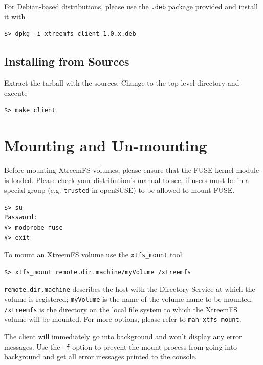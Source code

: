 \documentclass[a4paper,10pt]{book}
\begin{document}
For Debian-based distributions, please use the \texttt{.deb} package provided and install it with


\begin{verbatim}
$> dpkg -i xtreemfs-client-1.0.x.deb
\end{verbatim}



\subsection{Installing from Sources}

Extract the tarball with the sources. Change to the top level directory and execute


\begin{verbatim}
$> make client
\end{verbatim}


\section{Mounting and Un-mounting}
\label{sec:mount_vol}

Before mounting XtreemFS volumes, please ensure that the FUSE kernel module is loaded. Please check your distribution's manual to see, if users must be in a special group (e.g. \texttt{trusted} in openSUSE) to be allowed to mount FUSE.


\begin{verbatim}
$> su
Password:
#> modprobe fuse
#> exit
\end{verbatim}


To mount an XtreemFS volume use the \texttt{xtfs\_mount} tool.


\begin{verbatim}
$> xtfs_mount remote.dir.machine/myVolume /xtreemfs
\end{verbatim}


\texttt{remote.dir.machine} describes the host with the Directory Service at which the volume is registered; \texttt{myVolume} is the name of the volume name to be mounted. \texttt{/xtreemfs} is the directory on the local file system to which the XtreemFS volume will be mounted. For more options, please refer to \texttt{man xtfs\_mount}.

The client will immediately go into background and won't display any error messages. Use the \texttt{-f} option to prevent the mount process from going into background and get all error messages printed to the console.
\end{document}
